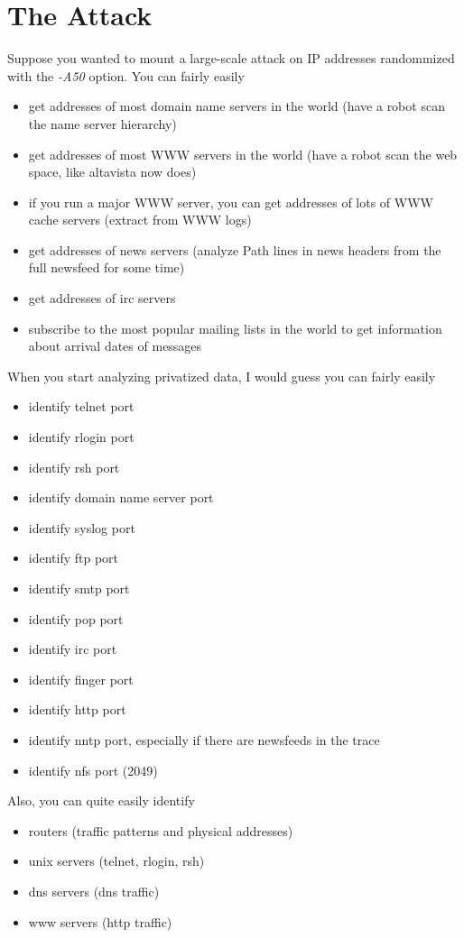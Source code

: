 \documentclass[10pt,onecolumn]{article}
\begin{document}
\section{The Attack}

Suppose you wanted to mount a large-scale attack on IP addresses
randommized with the \emph{-A50} option.  You can fairly easily
\begin{itemize}
\item get addresses of most domain name servers in the world
     (have a robot scan the name server hierarchy)
\item get addresses of most WWW servers in the world
     (have a robot scan the web space, like altavista now does)
\item if you run a major WWW server, you can get addresses of lots of
    WWW cache servers
     (extract from WWW logs)
\item get addresses of news servers
     (analyze Path lines in news headers from the full newsfeed for
     some time)
\item get addresses of irc servers
\item subscribe to the most popular mailing lists in the world to get
    information about arrival dates of messages
\end{itemize}

When you start analyzing privatized data, I would guess you can fairly
easily
\begin{itemize}
\item identify telnet port
\item identify rlogin port
\item identify rsh port
\item identify domain name server port
\item identify syslog port
\item identify ftp port
\item identify smtp port
\item identify pop port
\item identify irc port
\item identify finger port
\item identify http port
\item identify nntp port, especially if there are newsfeeds in the trace
\item identify nfs port (2049)
\end{itemize}

Also, you can quite easily identify
\begin{itemize}
\item routers (traffic patterns and physical addresses)
\item unix servers (telnet, rlogin, rsh)
\item dns servers (dns traffic)
\item www servers (http traffic)
\end{itemize}
\end{document}
